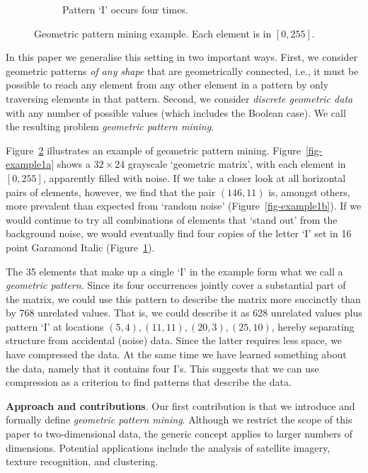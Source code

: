 \documentclass{llncs}
\begin{document}
\begin{figure}[b]
\begin{subfigure}[t]{0.37\textwidth}
\caption{Pattern `I' occurs four times.}
\label{fig-example1c}
\end{subfigure}%
\caption{Geometric pattern mining example. Each element is in $[0,255]$.}
\label{fig-example1}
\end{figure}  

In this paper we generalise this setting in two important ways. First, we consider geometric patterns \emph{of any shape} that are geometrically connected, i.e., it must be possible to reach any element from any other element in a pattern by only traversing elements in that pattern. Second, we consider \emph{discrete geometric data} with any number of possible values (which includes the Boolean case). We call the resulting problem \emph{geometric pattern mining}.

Figure~\ref{fig-example1} illustrates an example of geometric pattern mining.  Figure~\ref{fig-example1a} shows a $32 \times 24$ grayscale `geometric matrix', with each element in $[0,255]$, apparently filled with noise. If we take a closer look at all horizontal pairs of elements, however, we find that the pair $(146,11)$ is, amongst others, more prevalent than expected from `random noise' (Figure~\ref{fig-example1b}). If we would continue to try all combinations of elements that `stand out' from the background noise, we would eventually find four copies of the letter `I' set in 16 point Garamond Italic (Figure~\ref{fig-example1c}).

The 35 elements that make up a single `I' in the example form what we call a \emph{geometric pattern}. Since its four occurrences jointly cover a substantial part of the matrix, we could use this pattern to describe the matrix more succinctly than by 768 unrelated values. That is, we could describe it as 628 unrelated values plus pattern `I' at locations $(5,4), (11,11), (20,3), (25,10)$, hereby separating structure from accidental (noise) data. Since the latter requires less space, we have compressed the data. At the same time we have learned something about the data, namely that it contains four I's. This suggests that we can use compression as a criterion to find patterns that describe the data.

\smallskip
\noindent \textbf{Approach and contributions}. Our first contribution is that we introduce and formally define \emph{geometric pattern mining}. Although we restrict the scope of this paper to two-dimensional data, the generic concept applies to larger numbers of dimensions. Potential applications include the analysis of satellite imagery, texture recognition, and clustering.
\end{document}
